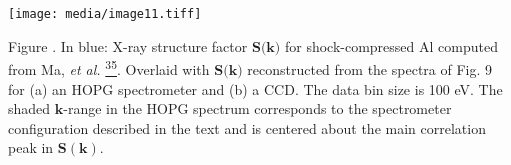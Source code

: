 \texttt{[image: media/image11.tiff]}


Figure . In blue: X-ray structure factor
\(\mathbf{S}\mathbf{(}\mathbf{k}\mathbf{)}\) for shock-compressed Al
computed from Ma, \emph{et al.}
\hyperref[t.-ma-et-al.-physical-review-letters-110-065001-2013.]{\textsuperscript{35}}.
Overlaid with \(\mathbf{S}\mathbf{(}\mathbf{k}\mathbf{)}\) reconstructed
from the spectra of Fig. 9 for (a) an HOPG spectrometer and (b) a CCD.
The data bin size is 100 eV. The shaded \(\mathbf{k}\)-range in the HOPG
spectrum corresponds to the spectrometer configuration described in the
text and is centered about the main correlation peak in
\(\mathbf{S(k)}\).

\subsection{}\label{section-5}

\subsection{}\label{section-6}

\subsection{}\label{section-7}

\subsection{}\label{section-8}

\subsection{}\label{section-9}

\subsection{}\label{section-10}

